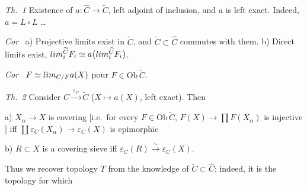 \documentclass[11pt,a4paper]{article}
\begin{document}

\emph{Th.\ 1} Existence of $a : \widehat{C} \to \widetilde{C}$, left adjoint
of inclusion, and \struck{\ill{}} $a$ is left exact. Indeed,
$a = L \circ L$ \ldots

\emph{Cor} \ a) Projective limits exist in $\widetilde{C}$, and
$\widetilde{C} \subset \widehat{C}$ commutes with them.
b) Direct limits exist, $\varinjlim_{i}^{\widetilde{C}} F_{i} \simeq
a\bigl(\varinjlim_{i}^{\widehat{C}} F_{i}\bigr)$.

\emph{Cor} \ $F \simeq \varinjlim_{C/F} a(X)$ pour $F \in
\mathrm{Ob}\,\widetilde{C}$.

\emph{Th.\ 2} Consider $C \xrightarrow{\ \varepsilon_{C}\ } \widetilde{C}$
($X \mapsto a(X)$, left exact). Then

a)    $X_{\alpha} \to X$ is covering
$[$i.e.\ for every $F \in \mathrm{Ob}\,\widetilde{C}$, $F(X) \to \prod
F(X_{\alpha})$ is injective$]$ iff $\coprod \varepsilon_{C}(X_{\alpha})
\to \varepsilon_{C}(X)$ is epimorphic

b) $R \subset X$ is a covering sieve iff $\varepsilon_{C}(R)
\xrightarrow{\ \sim\ } \varepsilon_{C}(X)$.

Thus we recover topology $T$ from the knowledge of $\widetilde{C} \subset
\widehat{C}$; indeed, it is the  topology for which
\struck{\ill{}}
\end{document}
